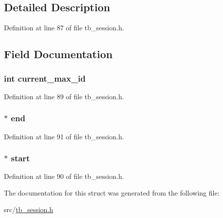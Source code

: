 \subsection{Detailed Description}


Definition at line 87 of file tb\-\_\-session.\-h.



\subsection{Field Documentation}
\hypertarget{structtb__session__list__t_a07d174b6514e5b02a3aa97ddc357d062}{
\subsubsection[{current\-\_\-max\-\_\-id}]{\setlength{\rightskip}{0pt plus 5cm}int current\-\_\-max\-\_\-id}}\label{structtb__session__list__t_a07d174b6514e5b02a3aa97ddc357d062}


Definition at line 89 of file tb\-\_\-session.\-h.

\hypertarget{structtb__session__list__t_aab7b6dca3cae04438a12695d690d54c7}{
\subsubsection[{end}]{$\ast$ end}}\label{structtb__session__list__t_aab7b6dca3cae04438a12695d690d54c7}


Definition at line 91 of file tb\-\_\-session.\-h.

\hypertarget{structtb__session__list__t_ae4ef1c5e563343eb946a3fe31c28be31}{
\subsubsection[{start}]{$\ast$ start}}\label{structtb__session__list__t_ae4ef1c5e563343eb946a3fe31c28be31}


Definition at line 90 of file tb\-\_\-session.\-h.



The documentation for this struct was generated from the following file\-:\begin{DoxyCompactItemize}
\item 
src/\hyperlink{tb__session_8h}{tb\-\_\-session.\-h}\end{DoxyCompactItemize}
